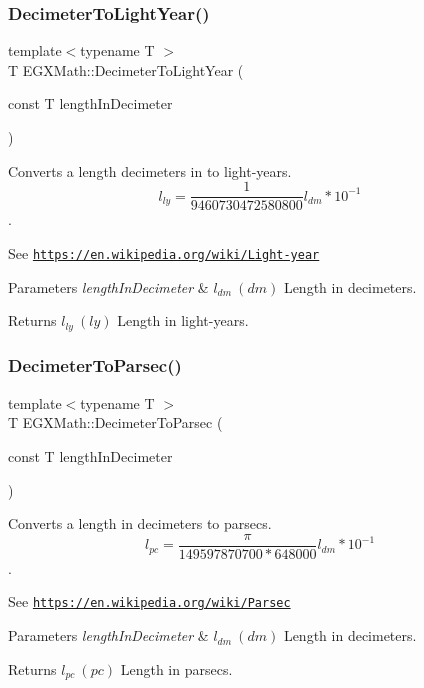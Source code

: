 \subsubsection{\texorpdfstring{Decimeter\+To\+Light\+Year()}{DecimeterToLightYear()}}
{\footnotesize\ttfamily template$<$typename T $>$ \\
T E\+G\+X\+Math\+::\+Decimeter\+To\+Light\+Year (\begin{DoxyParamCaption}\item[{const T}]{length\+In\+Decimeter }\end{DoxyParamCaption})}



Converts a length decimeters in to light-\/years. \[ l_{ly}= \frac{1}{9460730472580800} l_{dm} * 10^{-1} \]. 

See \href{https://en.wikipedia.org/wiki/Light-year}{\tt https\+://en.\+wikipedia.\+org/wiki/\+Light-\/year} 
\begin{DoxyParams}{Parameters}
{\em length\+In\+Decimeter} & $ l_{dm}\ (dm)$ Length in decimeters. \\
\hline
\end{DoxyParams}
\begin{DoxyReturn}{Returns}
$ l_{ly}\ (ly)$ Length in light-\/years. 
\end{DoxyReturn}
\mbox{\label{group___e_g_x_math-_conversions-_length_conversions-_decimeter-_astronomical_gad84954082a6648312ce4fc52d1e4d8eb}} 
\subsubsection{\texorpdfstring{Decimeter\+To\+Parsec()}{DecimeterToParsec()}}
{\footnotesize\ttfamily template$<$typename T $>$ \\
T E\+G\+X\+Math\+::\+Decimeter\+To\+Parsec (\begin{DoxyParamCaption}\item[{const T}]{length\+In\+Decimeter }\end{DoxyParamCaption})}



Converts a length in decimeters to parsecs. \[ l_{pc}=\frac{\pi}{149597870700 * 648000} l_{dm} * 10^{-1} \]. 

See \href{https://en.wikipedia.org/wiki/Parsec}{\tt https\+://en.\+wikipedia.\+org/wiki/\+Parsec} 
\begin{DoxyParams}{Parameters}
{\em length\+In\+Decimeter} & $ l_{dm}\ (dm)$ Length in decimeters. \\
\hline
\end{DoxyParams}
\begin{DoxyReturn}{Returns}
$ l_{pc}\ (pc)$ Length in parsecs. 
\end{DoxyReturn}
